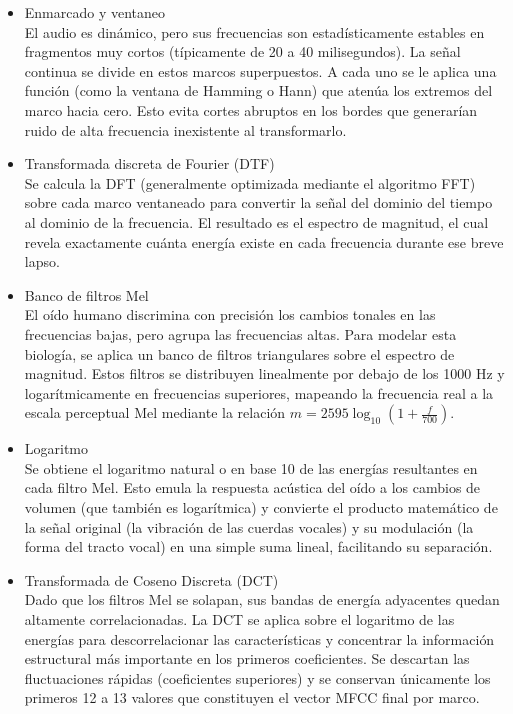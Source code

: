\documentclass[12pt]{article}
\begin{document}
\begin{itemize}
\begin{itemize}
			\item {Enmarcado y ventaneo} 	\\
			El audio es dinámico, pero sus frecuencias son estadísticamente estables en fragmentos muy cortos (típicamente de 20 a 40 milisegundos). La señal continua se divide en estos marcos superpuestos. A cada uno se le aplica una función (como la ventana de Hamming o Hann) que atenúa los extremos del marco hacia cero. Esto evita cortes abruptos en los bordes que generarían ruido de alta frecuencia inexistente al transformarlo.
			
			\item {Transformada discreta de Fourier (DTF)} 	\\
			Se calcula la DFT (generalmente optimizada mediante el algoritmo FFT) sobre cada marco ventaneado para convertir la señal del dominio del tiempo al dominio de la frecuencia. El resultado es el espectro de magnitud, el cual revela exactamente cuánta energía existe en cada frecuencia durante ese breve lapso.
			
			\item {Banco de filtros Mel}	\\
			El oído humano discrimina con precisión los cambios tonales en las frecuencias bajas, pero agrupa las frecuencias altas. Para modelar esta biología, se aplica un banco de filtros triangulares sobre el espectro de magnitud. Estos filtros se distribuyen linealmente por debajo de los 1000 Hz y logarítmicamente en frecuencias superiores, mapeando la frecuencia real a la escala perceptual Mel mediante la relación $m = 2595 \log_{10}(1 + \frac{f}{700})$.		
			
			
			\item {Logaritmo}	\\	
			
			Se obtiene el logaritmo natural o en base 10 de las energías resultantes en cada filtro Mel. Esto emula la respuesta acústica del oído a los cambios de volumen (que también es logarítmica) y convierte el producto matemático de la señal original (la vibración de las cuerdas vocales) y su modulación (la forma del tracto vocal) en una simple suma lineal, facilitando su separación.
			
			
			\item {Transformada de Coseno Discreta (DCT) } \\
			
			Dado que los filtros Mel se solapan, sus bandas de energía adyacentes quedan altamente correlacionadas. La DCT se aplica sobre el logaritmo de las energías para descorrelacionar las características y concentrar la información estructural más importante en los primeros coeficientes. Se descartan las fluctuaciones rápidas (coeficientes superiores) y se conservan únicamente los primeros 12 a 13 valores que constituyen el vector MFCC final por marco.
			

\end{itemize}
\end{itemize}
\end{document}
